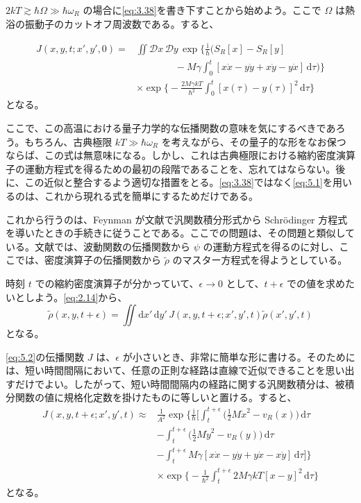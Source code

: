 $2kT\gtrsim\hbar\Omega\gg\hbar\omega_R$ の場合に\eqref{eq:3.38}を書き下すことから始めよう。ここで $\Omega$ は熱浴の振動子のカットオフ周波数である。すると、

\begin{equation}
\begin{aligned}
J(x,y,t;x',y',0)
={}&\iint\mathcal D x\,\mathcal D y\,
\exp\biggl\{\frac{\mathrm i}{\hbar}\biggl(
S_R[x]-S_R[y]\\
&\hspace{4em}-M\gamma\int_0^t
[x\dot x-y\dot y+x\dot y-y\dot x]\,\mathrm d\tau\biggr)\biggr\}\\
&\times\exp\biggl\{-\frac{2M\gamma kT}{\hbar^2}
\int_0^t[x(\tau)-y(\tau)]^2\,\mathrm d\tau\biggr\}
\end{aligned}
\tag{5.1}\label{eq:5.1}
\end{equation}
となる。

ここで、この高温における量子力学的な伝播関数の意味を気にするべきであろう。もちろん、古典極限 $kT\gg\hbar\omega_R$ を考えながら、その量子的な形をなお保つならば、この式は無意味になる。しかし、これは古典極限における縮約密度演算子の運動方程式を得るための最初の段階であることを、忘れてはならない。後に、この近似と整合するよう適切な措置をとる。\eqref{eq:3.38}ではなく\eqref{eq:5.1}を用いるのは、これから現れる式を簡単にするためだけである。

これから行うのは、Feynman が文献\cite{ref22}で汎関数積分形式から Schrödinger 方程式を導いたときの手続きに従うことである。ここでの問題は、その問題と類似している。文献\cite{ref22}では、波動関数の伝播関数から $\psi$ の運動方程式を得るのに対し、ここでは、密度演算子の伝播関数から $\widetilde\rho$ のマスター方程式を得ようとしている。

時刻 $t$ での縮約密度演算子が分かっていて、$\epsilon\to0$ として、$t+\epsilon$ での値を求めたいとしよう。\eqref{eq:2.14}から、
\begin{equation}
\widetilde\rho(x,y,t+\epsilon)=\iint\mathrm dx'\,\mathrm dy'\,
J(x,y,t+\epsilon;x',y',t)\widetilde\rho(x',y',t)
\tag{5.2}\label{eq:5.2}
\end{equation}
となる。

\eqref{eq:5.2}の伝播関数 $J$ は、$\epsilon$ が小さいとき、非常に簡単な形に書ける。そのためには、短い時間間隔において、任意の正則な経路は直線で近似できることを思い出すだけでよい。したがって、短い時間間隔内の経路に関する汎関数積分は、被積分関数の値に規格化定数を掛けたものに等しいと置ける\cite{ref22}。すると、
\begin{equation}
\begin{aligned}
J(x,y,t+\epsilon;x',y',t)
\approx{}&\frac{1}{A^2}\exp\biggl\{\frac{\mathrm i}{\hbar}\biggl[
\int_t^{t+\epsilon}\bigl(\tfrac12 M\dot x^2-v_R(x)\bigr)\,\mathrm d\tau\\
&-\int_t^{t+\epsilon}\bigl(\tfrac12 M\dot y^2-v_R(y)\bigr)\,\mathrm d\tau\\
&-\int_t^{t+\epsilon}M\gamma
[x\dot x-y\dot y+y\dot x-x\dot y]\,\mathrm d\tau\biggr]\biggr\}\\
&\times\exp\biggl\{-\frac{1}{\hbar^2}\int_t^{t+\epsilon}
2M\gamma kT[x-y]^2\,\mathrm d\tau\biggr\}
\end{aligned}
\tag{5.3}\label{eq:5.3}
\end{equation}
となる。

